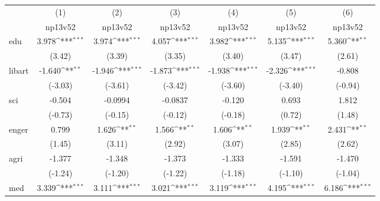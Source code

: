 {
\def\sym#1{\ifmmode^{#1}\else\(^{#1}\)\fi}
\begin{tabular}{l*{6}{c}}
\hline\hline
            &\multicolumn{1}{c}{(1)}&\multicolumn{1}{c}{(2)}&\multicolumn{1}{c}{(3)}&\multicolumn{1}{c}{(4)}&\multicolumn{1}{c}{(5)}&\multicolumn{1}{c}{(6)}\\
            &\multicolumn{1}{c}{np13v52}&\multicolumn{1}{c}{np13v52}&\multicolumn{1}{c}{np13v52}&\multicolumn{1}{c}{np13v52}&\multicolumn{1}{c}{np13v52}&\multicolumn{1}{c}{np13v52}\\
\hline
edu         &       3.978\sym{***}&       3.974\sym{***}&       4.057\sym{***}&       3.982\sym{***}&       5.135\sym{***}&       5.360\sym{**} \\
            &      (3.42)         &      (3.39)         &      (3.35)         &      (3.40)         &      (3.47)         &      (2.61)         \\
[1em]
libart      &      -1.640\sym{**} &      -1.946\sym{***}&      -1.873\sym{***}&      -1.938\sym{***}&      -2.326\sym{***}&      -0.808         \\
            &     (-3.03)         &     (-3.61)         &     (-3.42)         &     (-3.60)         &     (-3.40)         &     (-0.94)         \\
[1em]
sci         &      -0.504         &     -0.0994         &     -0.0837         &      -0.120         &       0.693         &       1.812         \\
            &     (-0.73)         &     (-0.15)         &     (-0.12)         &     (-0.18)         &      (0.72)         &      (1.48)         \\
[1em]
enger       &       0.799         &       1.626\sym{**} &       1.566\sym{**} &       1.606\sym{**} &       1.939\sym{**} &       2.431\sym{**} \\
            &      (1.45)         &      (3.11)         &      (2.92)         &      (3.07)         &      (2.85)         &      (2.62)         \\
[1em]
agri        &      -1.377         &      -1.348         &      -1.373         &      -1.333         &      -1.591         &      -1.470         \\
            &     (-1.24)         &     (-1.20)         &     (-1.22)         &     (-1.18)         &     (-1.10)         &     (-1.04)         \\
[1em]
med         &       3.339\sym{***}&       3.111\sym{***}&       3.021\sym{***}&       3.119\sym{***}&       4.195\sym{***}&       6.186\sym{***}\\

\end{tabular}}
